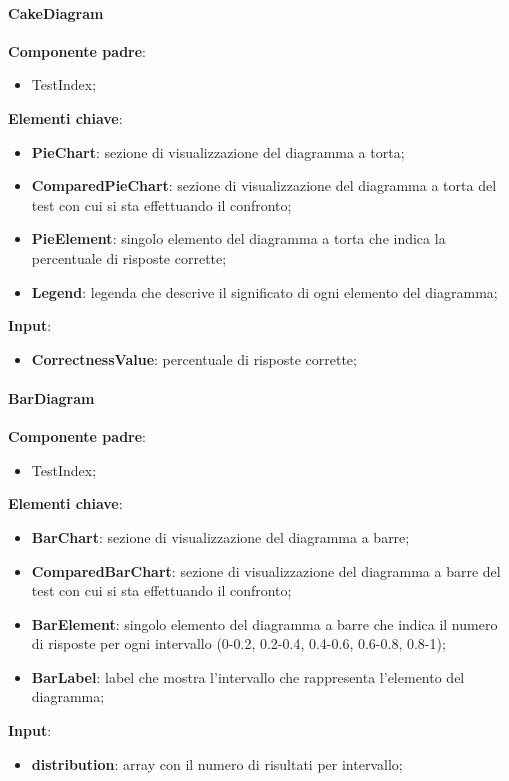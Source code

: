\paragraph{CakeDiagram}
\textbf{Componente padre}:
\begin{itemize}
    \item TestIndex;
\end{itemize}
\textbf{Elementi chiave}:
\begin{itemize}
    \item \textbf{PieChart}: sezione di visualizzazione del diagramma a torta;
    \item \textbf{ComparedPieChart}: sezione di visualizzazione del diagramma a torta del test con cui si sta effettuando il confronto;
    \item \textbf{PieElement}: singolo elemento del diagramma a torta che indica la percentuale di risposte corrette;
    \item \textbf{Legend}: legenda che descrive il significato di ogni elemento del diagramma;
\end{itemize}
\textbf{Input}:
\begin{itemize}
    \item \textbf{CorrectnessValue}: percentuale di risposte corrette;
\end{itemize}
\paragraph{BarDiagram}
\textbf{Componente padre}:
\begin{itemize}
    \item TestIndex;
\end{itemize}
\textbf{Elementi chiave}:
\begin{itemize}
    \item \textbf{BarChart}: sezione di visualizzazione del diagramma a barre;
    \item \textbf{ComparedBarChart}: sezione di visualizzazione del diagramma a barre del test con cui si sta effettuando il confronto;
    \item \textbf{BarElement}: singolo elemento del diagramma a barre che indica il numero di risposte per ogni intervallo (0-0.2, 0.2-0.4, 0.4-0.6, 0.6-0.8, 0.8-1);
    \item \textbf{BarLabel}: label che mostra l'intervallo che rappresenta l'elemento del diagramma;
\end{itemize}
\textbf{Input}:
\begin{itemize}
    \item \textbf{distribution}: array con il numero di risultati per intervallo;
\end{itemize}
